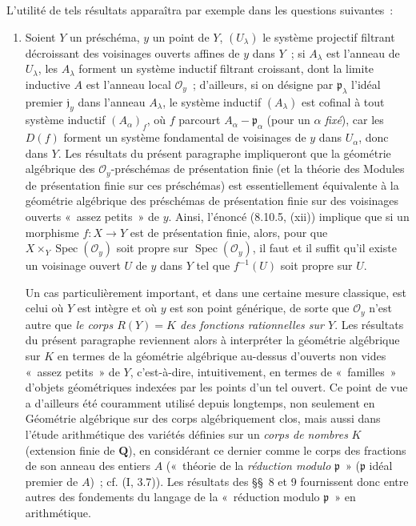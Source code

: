 \begin{env}[8.1.2]
L'utilité de tels résultats apparaîtra par exemple dans les questions
suivantes~:
\begin{enumerate}
\item[\emph{a)}] Soient $Y$ un préschéma, $y$ un point de $Y$, $(U_\lambda)$
le système projectif filtrant décroissant des voisinages ouverts affines de
$y$ dans $Y$~; si $A_\lambda$ est l'anneau de $U_\lambda$, les $A_\lambda$
forment un système inductif filtrant croissant, dont la limite inductive $A$
est l'anneau local $\mathcal O_y$~; d'ailleurs, si on désigne par
$\mathfrak p_\lambda$ l'idéal premier $\mathfrak j_y$ dans l'anneau
$A_\lambda$, le système inductif $(A_\lambda)$ est cofinal à tout système
inductif $(A_\alpha)_f$, où $f$ parcourt
$A_\alpha-\mathfrak p_\alpha$ (pour un $\alpha$ \emph{fixé}), car les $D(f)$
forment un système fondamental de voisinages de $y$ dans $U_\alpha$,
donc dans $Y$. Les résultats du présent paragraphe impliqueront que la
géométrie algébrique des $\mathcal O_y$-préschémas de présentation finie (et
la théorie des Modules de présentation finie sur ces préschémas) est
essentiellement équivalente à la géométrie algébrique des préschémas de
présentation finie sur des voisinages ouverts «~assez petits~» de $y$. Ainsi,
l'énoncé (8.10.5, (xii)) implique que si un morphisme $f:X\to Y$ est de
présentation finie, alors, pour que
$X\times_Y\operatorname{Spec}(\mathcal O_y)$ soit propre sur
$\operatorname{Spec}(\mathcal O_y)$, il faut et il suffit qu'il existe un
voisinage ouvert $U$ de $y$ dans $Y$ tel que $f^{-1}(U)$ soit propre sur $U$.

Un cas particulièrement important, et dans une certaine mesure classique,
est celui où $Y$ est intègre et où $y$ est son point générique, de sorte que
$\mathcal O_y$ n'est autre que \emph{le corps $R(Y)=K$ des fonctions
rationnelles sur $Y$}. Les résultats du présent paragraphe reviennent alors à
interpréter la géométrie algébrique sur $K$ en termes de la géométrie
algébrique au-dessus d'ouverts non vides «~assez petits~» de $Y$, c'est-à-dire,
intuitivement, en termes de «~familles~» d'objets géométriques indexées par les
points d'un tel ouvert. Ce point de vue a d'ailleurs été couramment utilisé
depuis longtemps, non seulement en Géométrie algébrique sur des corps
algébriquement clos, mais aussi dans l'étude arithmétique des variétés définies
sur un \emph{corps de nombres} $K$ (extension finie de $\mathbf Q$), en
considérant ce dernier comme le corps des fractions de son anneau des entiers
$A$ («~théorie de la \emph{réduction modulo} $\mathfrak p$~» ($\mathfrak p$
idéal premier de $A$)~; cf. (I, 3.7)). Les résultats des \S\S~8 et 9
fournissent donc entre autres des fondements du langage de la «~réduction
modulo $\mathfrak p$~» en arithmétique.


\end{enumerate}
\end{env}
